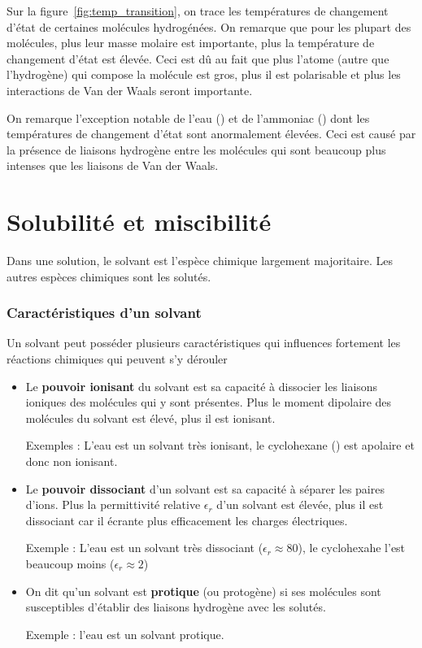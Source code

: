 \documentclass{cours}
\begin{document}
Sur la figure~\ref{fig:temp_transition}, on trace les températures de changement d'état de certaines molécules hydrogénées. On remarque que pour les plupart des molécules, plus leur masse molaire est importante, plus la température de changement d'état est élevée. Ceci est dû au fait que plus l'atome (autre que l'hydrogène) qui compose la molécule est gros, plus il est polarisable et plus les interactions de Van der Waals seront importante. 

On remarque l'exception notable de l'eau () et de l'ammoniac () dont les températures de changement d'état sont anormalement élevées. Ceci est causé par la présence de liaisons hydrogène entre les molécules qui sont beaucoup plus intenses que les liaisons de Van der Waals.



\section{Solubilité et miscibilité}%
\label{sec:solubilite_et_miscibilite}

Dans une solution, le solvant est l'espèce chimique largement majoritaire. Les autres espèces chimiques sont les solutés.

\subsubsection{Caractéristiques d'un solvant}%
\label{ssub:caracteristiques_d_un_solvant}
Un solvant peut posséder plusieurs caractéristiques qui influences fortement les réactions chimiques qui peuvent s'y dérouler
\begin{itemize}
  \item Le \textbf{pouvoir ionisant} du solvant est sa capacité à dissocier les liaisons ioniques des molécules qui y sont présentes. Plus le moment dipolaire des molécules du solvant est élevé, plus il est ionisant. 

  Exemples : L'eau est un solvant très ionisant, le cyclohexane () est apolaire et donc non ionisant.

  \item Le \textbf{pouvoir dissociant} d'un solvant est sa capacité à séparer les paires d'ions. Plus la permittivité relative $\epsilon_r$ d'un solvant est élevée, plus il est dissociant car il écrante plus efficacement les charges électriques.

  Exemple : L'eau est un solvant très dissociant ($\epsilon_r\approx 80$), le cyclohexahe l'est beaucoup moins ($\epsilon_r\approx 2$)  

  \item On dit qu'un solvant est \textbf{protique} (ou protogène) si ses molécules sont susceptibles d'établir des liaisons hydrogène avec les solutés.

  Exemple : l'eau est un solvant protique.
\end{itemize}
\end{document}

